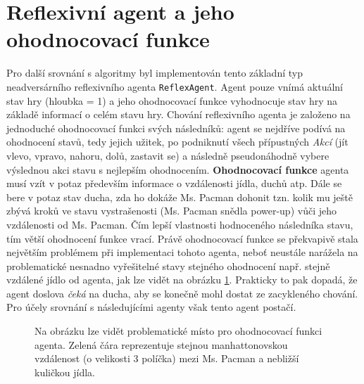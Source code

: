 \section{Reflexivní agent a jeho ohodnocovací funkce}
Pro další srovnání s algoritmy byl implementován tento základní typ neadversárního reflexivního agenta \texttt{ReflexAgent}. Agent pouze vnímá aktuální stav hry (hloubka = 1) a jeho ohodnocovací funkce vyhodnocuje stav hry na základě informací o celém stavu hry. Chování reflexivního agenta je založeno na jednoduché ohodnocovací funkci svých následníků: agent se nejdříve podívá na ohodnocení stavů, tedy jejich užitek, po podniknutí všech přípustných \textit{Akcí} (jít vlevo, vpravo, nahoru, dolů, zastavit se) a následně pseudonáhodně vybere výslednou akci stavu s nejlepším ohodnocením.
\textbf{Ohodnocovací funkce} agenta musí vzít v potaz především informace o vzdálenosti jídla, duchů atp. Dále se bere v potaz stav ducha, zda ho dokáže Ms. Pacman dohonit tzn. kolik mu ještě zbývá kroků ve stavu vystrašenosti (Ms. Pacman snědla power-up) vůči jeho vzdálenosti od Ms. Pacman. Čím lepší vlastnosti hodnoceného následníka stavu, tím větší ohodnocení funkce vrací. 
Právě ohodnocovací funkce se překvapivě stala největším problémem při implementaci tohoto agenta, neboť neustále narážela na problematické nesnadno vyřešitelné stavy stejného ohodnocení např. stejně vzdálené jídlo od agenta, jak lze vidět na obrázku \ref{img:reflexthrashV}. Prakticky to pak dopadá, že agent doslova \textit{čeká} na ducha, aby se konečně mohl dostat ze zacykleného chování. Pro účely srovnání s následujícími agenty však tento agent postačí.

\begin{figure}[!htbp]
\begin{center}
  \caption{Na obrázku lze vidět problematické místo pro ohodnocovací funkci agenta. Zelená čára reprezentuje stejnou manhattonovskou vzdálenost (o velikosti 3 políčka) mezi Ms. Pacman a nebližší kuličkou jídla.}
  \label{img:reflexthrashV}
\end{center}
\end{figure}

